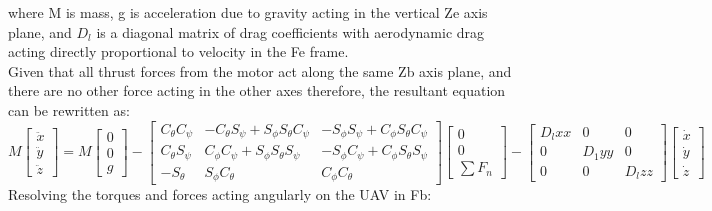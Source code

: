 \documentclass[12pt,a4paper,twoside]{report}
\begin{document}
				where M is mass, g is acceleration due to gravity acting in the vertical Ze axis plane, and \(D_l\) is a diagonal matrix of drag coefficients with aerodynamic drag acting directly proportional to velocity in the Fe frame.
				\\
				Given that all thrust forces from the motor act along the same Zb axis plane, and there are no other force acting in the other axes therefore, the resultant equation can be rewritten as:
				\\
				\begin{equation}
				M 
				\begin{bmatrix}
					\ddot{x} \\
					\ddot{y} \\
					\ddot{z}
				\end{bmatrix}
				=
				M 
				\begin{bmatrix}
					0 \\
					0 \\
					g
				\end{bmatrix}
				-
				\begin{bmatrix}
					C_\theta C_\psi & -C_\theta S_\psi + S_\phi S_\theta C_\psi & -S_\phi S_\psi + C_\phi S_\theta C_\psi \\
					C_\theta S_\psi &  C_\phi C_\psi + S_\phi S_\theta S_\psi   & -S_\phi C_\psi + C_\phi S_\theta S_\psi \\
					-S_\theta       &  S_\phi C_\theta                          &  C_\phi C_\theta
				\end{bmatrix}
				\begin{bmatrix}
					0 \\
					0 \\
					\sum F_n 
				\end{bmatrix}
				-
				\begin{bmatrix}
					D_lxx & 0 & 0 \\
					0 & D_1yy & 0 \\
					0 & 0 & D_lzz
				\end{bmatrix}
				\begin{bmatrix}
					\dot{x} \\
					\dot{y} \\
					\dot{z} 
				\end{bmatrix}
				\end{equation}  
				Resolving the torques and forces acting angularly on the UAV in Fb:
				\\
\end{document}
